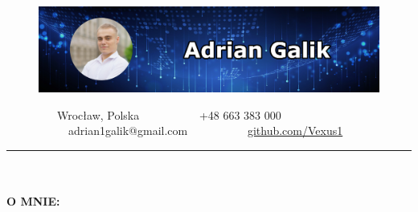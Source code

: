 \documentclass[10pt]{article}
\newcommand{\longline}{\rule{19.6cm}{1pt}}
\begin{document}
\begin{figure}[t]
    \hskip-1.55cm\includegraphics[scale=1.3625]{Galik_BANNER.png}
\end{figure}

\vspace*{-4ex}

\ \ \ \ \ \ \ \ \
\faMapMarker* Wrocław, Polska \ \ \ \ \ \ \ \ \ \
\faPhone +48 663 383 000 \ \ \ \ \ \ \ \ \ \
\faEnvelope \ adrian1galik@gmail.com \ \ \ \ \ \ \ \ \ \
\faGithub \href{https://github.com/Vexus1}{github.com/Vexus1}


\noindent \longline 
\\ \\
\noindent \fontsize{14pt}{14pt}\selectfont \textbf{\color{Violet}O MNIE:}
\fontsize{10pt}{10pt}\selectfont
\end{document}
